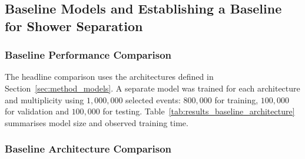 

\subsection{Baseline Models and Establishing a Baseline for Shower Separation}


\subsubsection{Baseline Performance Comparison}

The headline comparison uses the architectures defined in
Section~\ref{sec:method_models}. A separate model was trained for each
architecture and multiplicity using \(1{,}000{,}000\) selected events:
\(800{,}000\) for training, \(100{,}000\) for validation and \(100{,}000\)
for testing. Table~\ref{tab:results_baseline_architecture} summarises model
size and observed training time.
















\subsubsection{Baseline Architecture Comparison}

